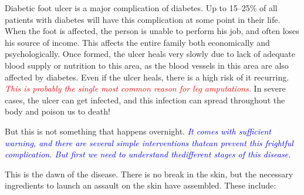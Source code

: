 Diabetic foot ulcer is a major compli\-cation of diabetes. Up to 15–25\% of all patients with diabetes will have this complication at some point in their life. When the foot is affected, the person is unable to perform his job, and often loses his source of income. This affects the entire family both economically and psychologically. Once formed, the ulcer heals very slowly due to lack of adequate blood supply or nutrition to this area, as the blood vessels in this area are also affected by diabetes. Even if the ulcer heals, there is a high risk of it recurring. \textcolor{red}{\textit{This is probably the single most common reason for leg amputations.}} In severe cases, the ulcer can get infected, and this infection can spread throughout the body and poison us to death!

But this is not something that happens overnight. \textcolor{blue}{\textit{It comes with suffi\-cient warning, and there are several simple interventions that\break can prevent this frightful complication. But first we need to understand the\break different stages of this disease.}}


This is the dawn of the disease. There is no break in the skin, but the necessary ingredients to launch an assault on the skin have assembled. These include:

